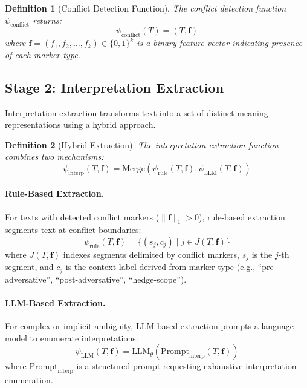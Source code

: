 \documentclass[11pt,a4paper]{article}
\newtheorem{definition}{Definition}
\begin{document}
\begin{definition}[Conflict Detection Function]
The conflict detection function $\psi_{\text{conflict}}$ returns:
\begin{equation}
\psi_{\text{conflict}}(T) = (T, \mathbf{f})
\end{equation}
where $\mathbf{f} = (f_1, f_2, \ldots, f_k) \in \{0,1\}^k$ is a binary feature 
vector indicating presence of each marker type.
\end{definition}

\subsection{Stage 2: Interpretation Extraction}

Interpretation extraction transforms text into a set of distinct meaning 
representations using a hybrid approach.

\begin{definition}[Hybrid Extraction]
The interpretation extraction function combines two mechanisms:
\begin{equation}
\psi_{\text{interp}}(T, \mathbf{f}) = \text{Merge}(\psi_{\text{rule}}(T, \mathbf{f}), \psi_{\text{LLM}}(T, \mathbf{f}))
\end{equation}
\end{definition}

\paragraph{Rule-Based Extraction.}
For texts with detected conflict markers ($\|\mathbf{f}\|_1 > 0$), 
rule-based extraction segments text at conflict boundaries:
\begin{equation}
\psi_{\text{rule}}(T, \mathbf{f}) = \{(s_j, c_j) \mid j \in J(T, \mathbf{f})\}
\end{equation}
where $J(T, \mathbf{f})$ indexes segments delimited by conflict markers, 
$s_j$ is the $j$-th segment, and $c_j$ is the context label derived from 
marker type (e.g., ``pre-adversative'', ``post-adversative'', ``hedge-scope'').

\paragraph{LLM-Based Extraction.}
For complex or implicit ambiguity, LLM-based extraction prompts a language 
model to enumerate interpretations:
\begin{equation}
\psi_{\text{LLM}}(T, \mathbf{f}) = \text{LLM}_{\theta}(\text{Prompt}_{\text{interp}}(T, \mathbf{f}))
\end{equation}
where $\text{Prompt}_{\text{interp}}$ is a structured prompt requesting 
exhaustive interpretation enumeration.
\end{document}
